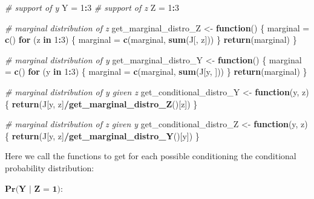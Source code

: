 \documentclass[
]{article}
\newenvironment{Shaded}{\begin{snugshade}}{\end{snugshade}}
\newcommand{\CommentTok}[1]{\textcolor[rgb]{0.56,0.35,0.01}{\textit{#1}}}
\newcommand{\ControlFlowTok}[1]{\textcolor[rgb]{0.13,0.29,0.53}{\textbf{#1}}}
\newcommand{\DecValTok}[1]{\textcolor[rgb]{0.00,0.00,0.81}{#1}}
\newcommand{\FunctionTok}[1]{\textcolor[rgb]{0.13,0.29,0.53}{\textbf{#1}}}
\newcommand{\NormalTok}[1]{#1}
\newcommand{\OtherTok}[1]{\textcolor[rgb]{0.56,0.35,0.01}{#1}}
\newcommand{\SpecialCharTok}[1]{\textcolor[rgb]{0.81,0.36,0.00}{\textbf{#1}}}
\begin{document}
\begin{Shaded}
\begin{Highlighting}[]
\CommentTok{\# support of y}
\NormalTok{Y }\OtherTok{=} \DecValTok{1}\SpecialCharTok{:}\DecValTok{3}
\CommentTok{\# support of z}
\NormalTok{Z }\OtherTok{=} \DecValTok{1}\SpecialCharTok{:}\DecValTok{3}

\CommentTok{\# marginal distribution of z}
\NormalTok{get\_marginal\_distro\_Z }\OtherTok{\textless{}{-}} \ControlFlowTok{function}\NormalTok{() \{}
\NormalTok{    marginal }\OtherTok{=} \FunctionTok{c}\NormalTok{()}
    \ControlFlowTok{for}\NormalTok{ (z }\ControlFlowTok{in} \DecValTok{1}\SpecialCharTok{:}\DecValTok{3}\NormalTok{) \{}
\NormalTok{        marginal }\OtherTok{=} \FunctionTok{c}\NormalTok{(marginal, }\FunctionTok{sum}\NormalTok{(J[, z]))}
\NormalTok{    \}}
    \FunctionTok{return}\NormalTok{(marginal)}
\NormalTok{\}}

\CommentTok{\# marginal distribution of y}
\NormalTok{get\_marginal\_distro\_Y }\OtherTok{\textless{}{-}} \ControlFlowTok{function}\NormalTok{() \{}
\NormalTok{    marginal }\OtherTok{=} \FunctionTok{c}\NormalTok{()}
    \ControlFlowTok{for}\NormalTok{ (y }\ControlFlowTok{in} \DecValTok{1}\SpecialCharTok{:}\DecValTok{3}\NormalTok{) \{}
\NormalTok{        marginal }\OtherTok{=} \FunctionTok{c}\NormalTok{(marginal, }\FunctionTok{sum}\NormalTok{(J[y, ]))}
\NormalTok{    \}}
    \FunctionTok{return}\NormalTok{(marginal)}
\NormalTok{\}}

\CommentTok{\# marginal distribution of y given z}
\NormalTok{get\_conditional\_distro\_Y }\OtherTok{\textless{}{-}} \ControlFlowTok{function}\NormalTok{(y, z) \{}
    \FunctionTok{return}\NormalTok{(J[y, z]}\SpecialCharTok{/}\FunctionTok{get\_marginal\_distro\_Z}\NormalTok{()[z])}
\NormalTok{\}}

\CommentTok{\# marginal distribution of z given y}
\NormalTok{get\_conditional\_distro\_Z }\OtherTok{\textless{}{-}} \ControlFlowTok{function}\NormalTok{(y, z) \{}
    \FunctionTok{return}\NormalTok{(J[y, z]}\SpecialCharTok{/}\FunctionTok{get\_marginal\_distro\_Y}\NormalTok{()[y])}
\NormalTok{\}}
\end{Highlighting}
\end{Shaded}

Here we call the functions to get for each possible conditioning the
conditional probability distribution:

\vspace{0.25cm}

\(\textbf{Pr(Y | Z = 1)}\):
\end{document}
